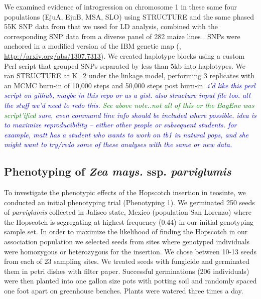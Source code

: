 \documentclass[12pt]{article}
\newcommand{\jri}[1]{\textcolor{blue}{ \emph{\scriptsize  #1}} }
\newcommand{\lev}[1]{\textcolor{green}{\emph{\scriptsize #1}} }
\begin{document}
We examined evidence of introgression on chromosome 1 in these same four populations (EjuA, EjuB, MSA, SLO) using STRUCTURE \citep{Falush2003} and the same phased 55K SNP data from \citep{Pyhajarvi2013} that we used for LD analysis, combined with the corresponding SNP data from a diverse panel of 282 maize lines \citep{Cook2012}. SNPs were anchored in a modified version of the IBM genetic map (\citep{Gerke2013}, \url{http://arxiv.org/abs/1307.7313}). We created haplotype blocks using a custom Perl script that grouped SNPs separated by less than 5kb into haplotypes. We ran STRUCTURE at K=2 under the linkage model, performing 3 replicates with an MCMC burn-in of 10,000 steps and 50,000 steps post burn-in. \jri{i'd like this perl script on github, maybe in this repo or as a gist. also structure input file too. all the stuff we'd need to redo this.} \lev{See above note..not all of this or the BayEnv was script'ified} \jri{sure, even command line info should be included where possible.  idea is to maximize reproducibility -- either other people or subsequent students. for example, matt has a student who wants to work on tb1 in natural pops, and she might want to try/redo some of these analyses with the same or new data.}

\subsection*{Phenotyping of \emph{Zea mays.} ssp. \emph{parviglumis}}

To investigate the phenotypic effects of the Hopscotch insertion in teosinte, we conducted an initial phenotyping trial (Phenotyping 1). We germinated 250 seeds of \emph{parviglumis} collected in Jalisco state, Mexico (population San Lorenzo) \citep{Hufford2010} where the Hopscotch is segregating at highest frequency (0.44) in our initial genotyping sample set. In order to maximize the likelihood of finding the Hopscotch in our association population we selected seeds from sites where genotyped individuals were homozygous or heterozygous for the insertion. We chose between 10-13 seeds from each of 23 sampling sites. We treated seeds with fungicide and germinated them in petri dishes with filter paper. Successful germinations (206 individuals) were then planted into one gallon size pots with potting soil and randomly spaced one foot apart on greenhouse benches. Plants were watered three times a day. 
\end{document}
